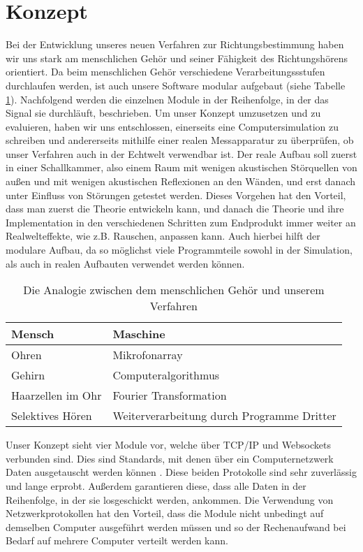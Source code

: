 \section{Konzept}
Bei der Entwicklung unseres neuen Verfahren zur Richtungsbestimmung haben wir uns stark am menschlichen Gehör und seiner Fähigkeit des Richtungshörens orientiert. Da beim menschlichen Gehör verschiedene Verarbeitungssstufen durchlaufen werden, ist auch unsere Software modular aufgebaut (siehe Tabelle \ref{analog}). Nachfolgend werden die einzelnen Module in der Reihenfolge, in der das Signal sie durchläuft, beschrieben. 
Um unser Konzept umzusetzen und zu evaluieren, haben wir uns entschlossen, einerseits eine Computersimulation zu schreiben und andererseits mithilfe einer realen Messapparatur zu überprüfen, ob unser Verfahren auch in der Echtwelt verwendbar ist. Der reale Aufbau soll zuerst in einer Schallkammer, also einem Raum mit wenigen akustischen Störquellen von außen und mit wenigen akustischen Reflexionen an den Wänden, und erst danach unter Einfluss von Störungen getestet werden. Dieses Vorgehen hat den Vorteil, dass man zuerst die Theorie entwickeln kann, und danach die Theorie und ihre Implementation in den verschiedenen Schritten zum Endprodukt immer weiter an Realwelteffekte, wie z.B. Rauschen, anpassen kann. Auch hierbei hilft der modulare Aufbau, da so möglichst viele Programmteile sowohl in der Simulation, als auch in realen Aufbauten verwendet werden können.
\begin{table}[h]
	\centering
    \begin{tabular}{ll}
		Mensch            & Maschine                                   \\ \hline
        Ohren             & Mikrofonarray                              \\
        Gehirn            & Computeralgorithmus                        \\
		Haarzellen im Ohr & Fourier Transformation                     \\
		Selektives Hören  & Weiterverarbeitung durch Programme Dritter
	\end{tabular}
	\caption{Die Analogie zwischen dem menschlichen Gehör und unserem Verfahren}
	\label{analog}
\end{table}
Unser Konzept sieht vier Module vor, welche über TCP/IP und Websockets verbunden sind. Dies sind Standards, mit denen über ein Computernetzwerk Daten ausgetauscht werden können \cite{tcp} \cite{websockets}. Diese beiden Protokolle sind sehr zuverlässig und lange erprobt. Außerdem garantieren diese, dass alle Daten in der Reihenfolge, in der sie losgeschickt werden, ankommen. Die Verwendung von Netzwerkprotokollen hat den Vorteil, dass die Module nicht unbedingt auf demselben Computer ausgeführt werden müssen und so der Rechenaufwand bei Bedarf auf mehrere Computer verteilt werden kann.

